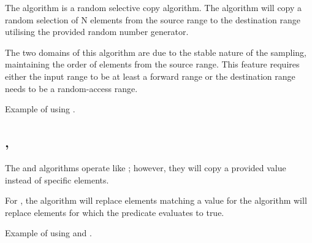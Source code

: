 The  algorithm is a random selective copy algorithm. The algorithm will copy a random selection of N elements from the source range to the destination range utilising the provided random number generator.


The two domains of this algorithm are due to the stable nature of the sampling, maintaining the order of elements from the source range. This feature requires either the input range to be at least a forward range or the destination range needs to be a random-access range.

\begin{codebox}[]{\href{https://compiler-explorer.com/z/75WPEfjM9}{\ExternalLink}}
\footnotesize Example of using .
\tcblower
{}
\end{codebox}

\subsection{\texorpdfstring{, }{\texttt{std::replace\_copy}, \texttt{std::replace\_copy\_if}}}

The  and  algorithms operate like ; however, they will copy a provided value instead of specific elements.

For , the algorithm will replace elements matching a value for  the algorithm will replace elements for which the predicate evaluates to true.


\begin{codebox}[]{\href{https://compiler-explorer.com/z/TPTq4q8rr}{\ExternalLink}}
\footnotesize Example of using  and .
\tcblower
{}
\end{codebox}


